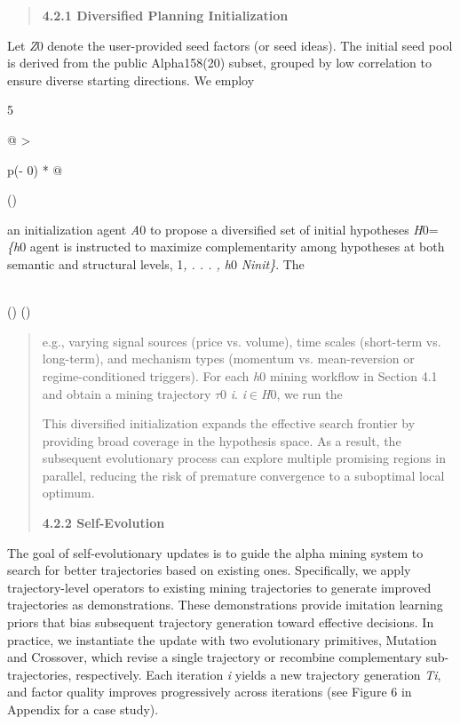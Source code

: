 \documentclass[
]{article}
\begin{document}
\begin{quote}
\textbf{4.2.1 Diversified Planning Initialization}
\end{quote}

Let \emph{Z}0 denote the user-provided seed factors (or seed ideas). The
initial seed pool is derived from the public Alpha158(20) subset,
grouped by low correlation to ensure diverse starting directions. We
employ

5

\begin{longtable}[]{@{}
  >{\raggedright\arraybackslash}p{(\columnwidth - 0\tabcolsep) * }@{}}
\toprule()
\begin{minipage}[b]{\linewidth}\raggedright
an initialization agent \emph{A}0 to propose a diversified set of
initial hypotheses \emph{H}0= \emph{\{h}0 agent is instructed to
maximize complementarity among hypotheses at both semantic and
structural levels, 1\emph{, . . . , h}0 \emph{Ninit\}}. The
\end{minipage} \\
\midrule()
\endhead
\bottomrule()
\end{longtable}

\begin{quote}
e.g., varying signal sources (price vs. volume), time scales (short-term
vs. long-term), and mechanism types (momentum vs. mean-reversion or
regime-conditioned triggers). For each \emph{h}0 mining workflow in
Section 4.1 and obtain a mining trajectory \emph{$\tau$}0 \emph{i}.
\emph{i$\in$H}0, we run the

This diversified initialization expands the effective search frontier by
providing broad coverage in the hypothesis space. As a result, the
subsequent evolutionary process can explore multiple promising regions
in parallel, reducing the risk of premature convergence to a suboptimal
local optimum.

\textbf{4.2.2 Self-Evolution}
\end{quote}

The goal of self-evolutionary updates is to guide the alpha mining
system to search for better trajectories based on existing ones.
Specifically, we apply trajectory-level operators to existing mining
trajectories to generate improved trajectories as demonstrations. These
demonstrations provide imitation learning priors that bias subsequent
trajectory generation toward effective decisions. In practice, we
instantiate the update with two evolutionary primitives, Mutation and
Crossover, which revise a single trajectory or recombine complementary
sub-trajectories, respectively. Each iteration \emph{i} yields a new
trajectory generation \emph{Ti}, and factor quality improves
progressively across iterations (see Figure 6 in Appendix for a case
study).
\end{document}
